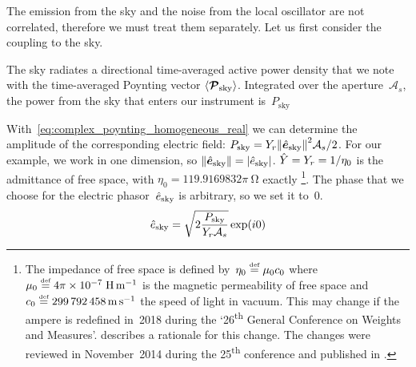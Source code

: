 The emission from the sky and the noise from the local oscillator are not correlated, therefore we must treat them separately.
Let us first consider the coupling to the sky.

The sky radiates a directional time-averaged active power density
that we note with the time-averaged Poynting vector
$\langle \bm{\mathcal{P}}_\text{sky} \rangle$.
Integrated over the aperture~$\mathcal{A}_s$, the power from the sky that enters our instrument is~$P_\text{sky}$

With~\cref{eq:complex_poynting_homogeneous_real} we can determine the amplitude of the corresponding electric field:
$P_\text{sky} = Y_r \norm{\vectcp{e}_\text{sky}}^2 \mathcal{A}_s / 2$.
For our example, we work in one dimension, so
$\norm{\vectcp{e}_\text{sky}} = \abs{\cp{e}_\text{sky}}$.
$\hat{Y}=Y_r=1/\eta_0$ is the admittance of free space, with $\eta_0 = 119.9169832\pi~\si{\ohm}$ exactly%
\footnote{
    The impedance of free space is defined by~$\eta_0 \stackrel{\text{\tiny def}}{=} \mu_0 c_0$ where
    $\mu_0 \equaldef 4\pi\times10^{-7}\;\si{\henry\per\meter}$
    is the magnetic permeability of free space and
    $c_0 \stackrel{\text{\tiny def}}{=} \SI{299792458}{\meter\per\second}$
    the speed of light in vacuum.
    This may change if the ampere is redefined in~2018 during the
    `26\textsuperscript{th} General Conference on Weights and Measures'.
    \textcite{mills2006redefinition} describes a rationale for this change.
    The changes were reviewed in November~2014 during the 25\textsuperscript{th} conference and published in \textcite{resolutioncgpm2014}.
}.
The phase that we choose for the electric phasor~$\hat{e}_\text{sky}$ is arbitrary, so we set it to~0.
\begin{equation}
    \hat{e}_\text{sky} = \sqrt{
        2
        \frac{P_\text{sky}}{Y_r \mathcal{A}_s}
    } \exp(i0)
\end{equation}

